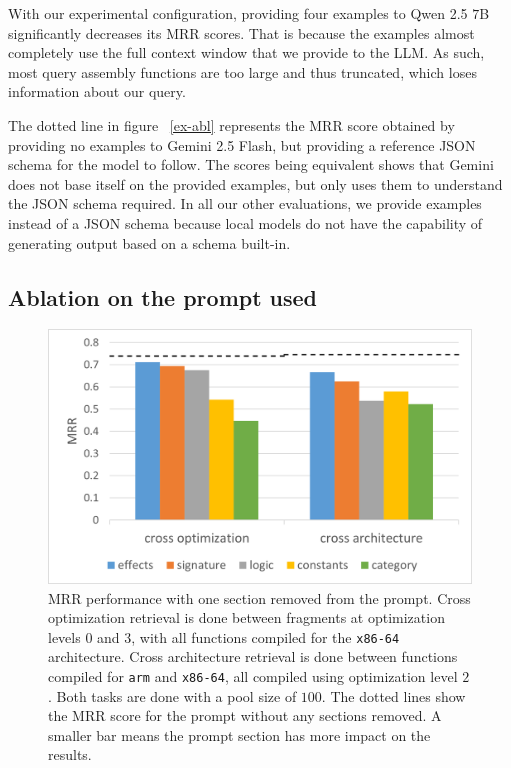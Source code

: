 With our experimental configuration, providing four examples to Qwen 2.5 \(7\)B significantly decreases its MRR scores. That is because
the examples almost completely use the full context window that we provide to the LLM. As such, most query assembly functions are
too large and thus truncated, which loses information about our query.

The dotted line in figure ~\ref{ex-abl} represents the MRR score obtained by providing no examples to Gemini 2.5 Flash, but providing a reference JSON
schema for the model to follow. The scores being equivalent shows that Gemini does not base itself on the provided examples, but only
uses them to understand the JSON schema required. In all our other evaluations, we provide examples instead of a JSON schema because local
models do not have the capability of generating output based on a schema built-in.

\subsection{Ablation on the prompt used}

\begin{figure}[htbp]
\centerline{\includegraphics[width=\linewidth]{prompt-ablation}}
\caption{
MRR performance with one section removed from the prompt. Cross optimization retrieval is done between fragments at
optimization levels \(0\) and \(3\), with all functions compiled for the \texttt{x86-64} architecture. Cross architecture retrieval is done between functions
compiled for \texttt{arm} and \texttt{x86-64}, all compiled using optimization level \(2\). Both tasks are done with a pool size of \(100\). The dotted lines
show the MRR score for the prompt without any sections removed. A smaller bar means the prompt section has more impact on the results.}
\label{prompt-abl}
\end{figure}

